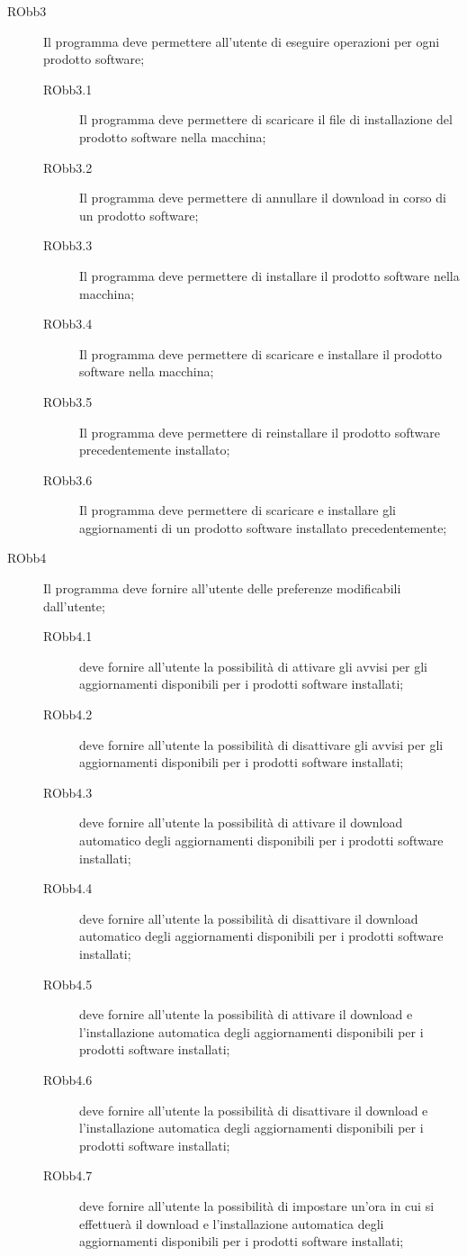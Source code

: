 \documentclass[../RelazioneFinale]{subfiles}
\begin{document}
\begin{description}
				\item[RObb3] Il programma deve permettere all'utente di eseguire operazioni per ogni prodotto software;
				\begin{description}
					\item[RObb3.1] Il programma deve permettere di scaricare il file di installazione del prodotto software nella macchina;
					\item[RObb3.2] Il programma deve permettere di annullare il download in corso di un prodotto software;
					\item[RObb3.3] Il programma deve permettere di installare il prodotto software nella macchina;
					\item[RObb3.4] Il programma deve permettere di scaricare e installare il prodotto software nella macchina;
					\item[RObb3.5] Il programma deve permettere di reinstallare il prodotto software precedentemente installato;
					\item[RObb3.6] Il programma deve permettere di scaricare e installare gli aggiornamenti di un prodotto software installato precedentemente;
				\end{description}

				\item[RObb4] Il programma deve fornire all'utente delle preferenze modificabili dall'utente;
				\begin{description}
					\item[RObb4.1] deve fornire all'utente la possibilità di attivare gli avvisi per gli aggiornamenti disponibili per i prodotti software installati;
					\item[RObb4.2] deve fornire all'utente la possibilità di disattivare gli avvisi per gli aggiornamenti disponibili per i prodotti software installati;
					\item[RObb4.3] deve fornire all'utente la possibilità di attivare il download automatico degli aggiornamenti disponibili per i prodotti software installati;
					\item[RObb4.4] deve fornire all'utente la possibilità di disattivare il download automatico degli aggiornamenti disponibili per i prodotti software installati;
					\item[RObb4.5] deve fornire all'utente la possibilità di attivare il download e l'installazione automatica degli aggiornamenti disponibili per i prodotti software installati;
					\item[RObb4.6] deve fornire all'utente la possibilità di disattivare il download e l'installazione automatica degli aggiornamenti disponibili per i prodotti software installati;
					\item[RObb4.7] deve fornire all'utente la possibilità di impostare un'ora  in cui si effettuerà il download e l'installazione automatica degli aggiornamenti disponibili per i prodotti software installati;
				\end{description}


\end{description}
\end{document}
